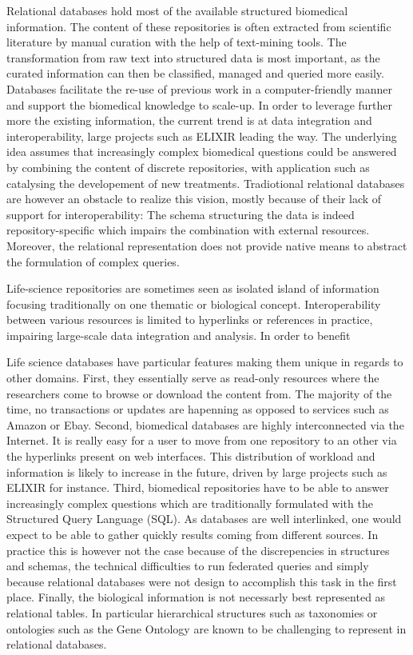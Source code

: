 \documentclass{bioinfo}
\begin{document}
Relational databases hold most of the available structured biomedical information. The content of these repositories is often
extracted from scientific literature by manual curation with the help of text-mining tools. The transformation from raw text into
structured data is most important, as the curated information can then be classified, managed and queried more easily. Databases facilitate
the re-use of previous work in a computer-friendly manner and support the biomedical knowledge to scale-up. In order to leverage further 
more the existing information, the current trend is at data integration and interoperability, large projects such as ELIXIR leading the way.
The underlying idea assumes that increasingly complex biomedical questions could be answered by combining the content of discrete repositories,
with application such as catalysing the developement of new treatments. Tradiotional relational databases are however an obstacle to realize 
this vision, mostly because of their lack of support for interoperability:
The schema structuring the data is indeed repository-specific which impairs the combination with external resources. Moreover, the relational
representation does not provide native means to abstract the formulation of complex queries.



Life-science repositories are 
sometimes seen as isolated island of information focusing traditionally on one thematic or biological concept. 
Interoperability between various resources is limited to hyperlinks or references in practice, impairing large-scale data 
integration and analysis. In order to benefit 


Life science databases have particular features making them unique in regards to other domains. First, they essentially serve as read-only 
resources where the researchers come to browse or download the content from. The majority of the time, no transactions or updates 
are hapenning as opposed to services such as Amazon or Ebay. Second, biomedical databases are highly interconnected via the Internet. 
It is really easy for a user to move from one repository to an other via the hyperlinks present on web interfaces. This distribution of workload 
and information is likely to increase in the future, driven by large projects such as ELIXIR for instance.
Third, biomedical repositories have to be able to answer increasingly complex questions which 
are traditionally formulated with the Structured Query Language (SQL). As databases are well interlinked, one would expect to be able to
gather quickly results coming from different sources. In practice this is however not the case because of the discrepencies in 
structures and schemas, the technical difficulties to run federated queries and simply because relational databases were not design to 
accomplish this task in the first place. Finally, the biological information is not necessarly best represented as relational tables. 
In particular hierarchical structures such as taxonomies or ontologies such as the Gene Ontology are known to be challenging 
to represent in relational databases. 
\end{document}
